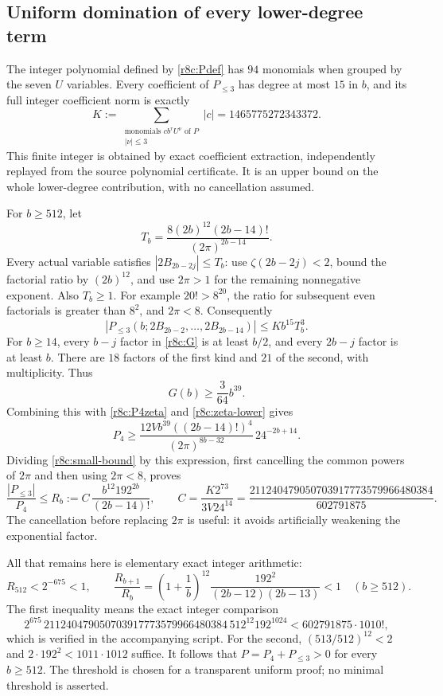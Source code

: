 \subsection{Uniform domination of every lower-degree term}

The integer polynomial defined by \eqref{r8c:Pdef} has $94$
monomials when grouped by the seven $U$ variables. Every coefficient
of $P_{\le3}$ has degree at most $15$ in $b$, and its full integer
coefficient norm is exactly
\begin{equation}\label{r8c:K}
 K:=\sum_{\substack{\text{monomials }c b^rU^\nu\text{ of }P\\
                         |\nu|\le3}}|c|
       =1465775272343372.
\end{equation}
This finite integer is obtained by exact coefficient extraction,
independently replayed from the source polynomial certificate.
It is an upper bound on the whole lower-degree contribution, with
no cancellation assumed.

For $b\ge512$, let
\[
 T_b=\frac{8(2b)^{12}(2b-14)!}{(2\pi)^{2b-14}}.
\]
Every actual variable satisfies $|2B_{2b-2j}|\le T_b$:
use $\zeta(2b-2j)<2$, bound the factorial ratio by $(2b)^{12}$,
and use $2\pi>1$ for the remaining nonnegative exponent.
Also $T_b\ge1$. For example $20!>8^{20}$, the ratio for subsequent
even factorials is greater than $8^2$, and $2\pi<8$.
Consequently
\begin{equation}\label{r8c:small-bound}
 |P_{\le3}(b;2B_{2b-2},\ldots,2B_{2b-14})|
 \le Kb^{15}T_b^3.
\end{equation}
For $b\ge14$, every $b-j$ factor in \eqref{r8c:G} is at least
$b/2$, and every $2b-j$ factor is at least $b$. There are $18$
factors of the first kind and $21$ of the second, with multiplicity.
Thus
\[
 G(b)\ge\frac{3}{64}b^{39}.
\]
Combining this with \eqref{r8c:P4zeta} and
\eqref{r8c:zeta-lower} gives
\[
 P_4\ge
 \frac{12Vb^{39}((2b-14)!)^4}{(2\pi)^{8b-32}}\,24^{-2b+14}.
\]
Dividing \eqref{r8c:small-bound} by this expression, first cancelling
the common powers of $2\pi$ and then using $2\pi<8$, proves
\begin{equation}\label{r8c:ratio-bound}
 \frac{|P_{\le3}|}{P_4}
 \le R_b:=C\,\frac{b^{12}192^{2b}}{(2b-14)!},\qquad
 C=\frac{K2^{73}}{3V24^{14}}
   =\frac{211240479050703917773579966480384}{602791875}.
\end{equation}
The cancellation before replacing $2\pi$ is useful: it avoids
artificially weakening the exponential factor.

All that remains here is elementary exact integer arithmetic:
\begin{equation}\label{r8c:base-bound}
 R_{512}<2^{-675}<1,
 \qquad
 \frac{R_{b+1}}{R_b}
 =\left(1+\frac1b\right)^{12}
   \frac{192^2}{(2b-12)(2b-13)}<1\quad(b\ge512).
\end{equation}
The first inequality means the exact integer comparison
\[
 2^{675}\,211240479050703917773579966480384\,
       512^{12}192^{1024}
       <602791875\cdot1010!,
\]
which is verified in the accompanying script. For the second,
$(513/512)^{12}<2$ and $2\cdot192^2<1011\cdot1012$ suffice.
It follows that $P=P_4+P_{\le3}>0$ for every $b\ge512$.
The threshold is chosen for a transparent uniform proof; no minimal
threshold is asserted.


